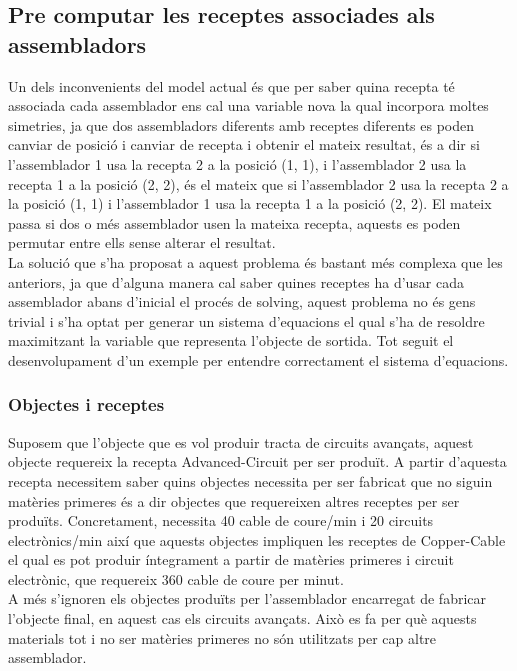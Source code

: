 \subsection{Pre computar les receptes associades als assembladors}\label{precompute-recipes}
Un dels inconvenients del model actual és que per saber quina recepta té associada cada assemblador ens cal una variable nova la qual incorpora moltes simetries, ja que dos assembladors diferents amb receptes diferents es poden canviar de posició i canviar de recepta i obtenir el mateix resultat, és a dir si l'assemblador 1 usa la recepta 2 a la posició (1, 1), i l'assemblador 2 usa la recepta 1 a la posició (2, 2), és el mateix que si l'assemblador 2 usa la recepta 2 a la posició (1, 1) i l'assemblador 1 usa la recepta 1 a la posició (2, 2). El mateix passa si dos o més assemblador usen la mateixa recepta, aquests es poden permutar entre ells sense alterar el resultat.\\

La solució que s'ha proposat a aquest problema és bastant més complexa que les anteriors, ja que d'alguna manera cal saber quines receptes ha d'usar cada assemblador abans d'inicial el procés de solving, aquest problema no és gens trivial i s'ha optat per generar un sistema d'equacions el qual s'ha de resoldre maximitzant la variable que representa l'objecte de sortida. Tot seguit el desenvolupament d'un exemple per entendre correctament el sistema d'equacions.\\

\subsubsection{Objectes i receptes}
Suposem que l'objecte que es vol produir tracta de circuits avançats, aquest objecte requereix la recepta Advanced-Circuit per ser produït. A partir d'aquesta recepta necessitem saber quins objectes necessita per ser fabricat que no siguin matèries primeres és a dir objectes que requereixen altres receptes per ser produïts. Concretament, necessita 40 cable de coure/min i 20 circuits electrònics/min així que aquests objectes impliquen les receptes de Copper-Cable el qual es pot produir íntegrament a partir de matèries primeres i circuit electrònic, que requereix 360 cable de coure per minut.\\
A més s'ignoren els objectes produïts per l'assemblador encarregat de fabricar l'objecte final, en aquest cas els circuits avançats. Això es fa per què aquests materials tot i no ser matèries primeres no són utilitzats per cap altre assemblador.

